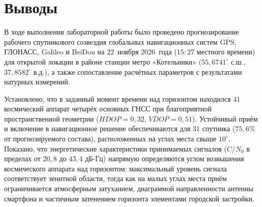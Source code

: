\section{Выводы}

В ходе выполнения лабораторной работы было проведено прогнозирование рабочего спутникового созвездия глобальных навигационных систем GPS, ГЛОНАСС, Galileo и BeiDou на $22$~ноября 2026~года ($15{:}27$ местного времени) для открытой локации в районе станции метро «Котельники» ($55{,}6741^\circ\text{ с.ш.}$, $37{,}8582^\circ\text{ в.д.}$), а также сопоставление расчётных параметров с результатами натурных измерений.

Установлено, что в заданный момент времени над горизонтом находился $41$ космический аппарат четырёх основных ГНСС при благоприятной пространственной геометрии ($HDOP = 0{,}32$, $VDOP = 0{,}51$). Устойчивый приём и включение в навигационное решение обеспечиваются для $31$ спутника ($75{,}6\%$ от прогнозируемого состава), расположенных на углах места свыше $10^\circ$. Показано, что энергетические характеристики принимаемых сигналов ($C/N_0$ в пределах от $20{,}8$ до $43{,}4\text{ дБ-Гц}$) напрямую определяются углом возвышения космического аппарата над горизонтом: максимальный уровень сигнала соответствует зенитной области, тогда как на малых углах места приём ограничивается атмосферным затуханием, диаграммой направленности антенны смартфона и частичным затенением горизонта элементами городской застройки.
